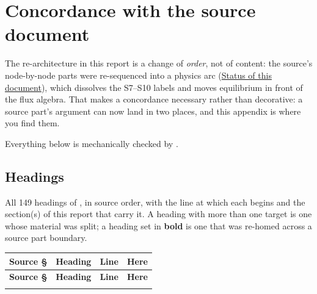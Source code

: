 %
%

\section{Concordance with the source document}
\label{app:concordance}

The re-architecture in this report is a change of \emph{order}, not of content:
the source's node-by-node parts were re-sequenced into a physics arc
(\hyperref[sec:status]{Status of this document}), which dissolves the S7--S10 labels and moves equilibrium
in front of the flux algebra. That makes a concordance necessary rather than
decorative: a source part's argument can now land in two places, and this
appendix is where you find them.

Everything below is mechanically checked by
.

\subsection{Headings}
\label{app:headings}

All 149 headings of , in source order, with the line at
which each begins and the section(s) of this report that carry it. A heading
with more than one target is one whose material was split; a heading set in
\textbf{bold} is one that was re-homed across a source part boundary.

\begingroup
\footnotesize
\begin{longtable}{@{}L{1.5cm} L{7.3cm} r L{4.3cm}@{}}
\toprule
\textbf{Source \S} & \textbf{Heading} & \textbf{Line} & \textbf{Here} \\
\midrule
\endfirsthead
\toprule
\textbf{Source \S} & \textbf{Heading} & \textbf{Line} & \textbf{Here} \\
\midrule
\endhead
\bottomrule
\endfoot

\end{longtable}
\endgroup

